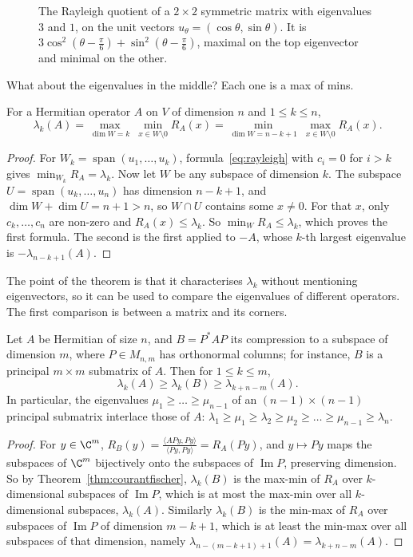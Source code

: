 \begin{figure}[ht]
\centering
{}
\caption{The Rayleigh quotient of a $2\times2$ symmetric matrix with eigenvalues $3$ and $1$, on the unit vectors
$u_\theta=(\cos\theta,\sin\theta)$. It is $3\cos^2(\theta-\frac\pi6)+\sin^2(\theta-\frac\pi6)$, maximal on the top eigenvector
and minimal on the other.}
\label{fig:rayleigh}
\end{figure}

What about the eigenvalues in the middle? Each one is a max of mins.

\begin{theorem}\label{thm:courantfischer}
For a Hermitian operator $A$ on $V$ of dimension $n$ and $1\le k\le n$,
\[
\lambda_k(A)=\max_{\dim W=k}\ \min_{x\in W\setminus0}R_A(x)=\min_{\dim W=n-k+1}\ \max_{x\in W\setminus0}R_A(x).
\]
\end{theorem}
\begin{proof}
For $W_k=\operatorname{span}(u_1,\dots,u_k)$, formula~\eqref{eq:rayleigh} with $c_i=0$ for $i>k$ gives $\min_{W_k}R_A=
\lambda_k$. Now let $W$ be any subspace of dimension $k$. The subspace $U=\operatorname{span}(u_k,\dots,u_n)$ has dimension
$n-k+1$, and $\dim W+\dim U=n+1>n$, so $W\cap U$ contains some $x\ne0$. For that $x$, only $c_k,\dots,c_n$ are non-zero
and $R_A(x)\le\lambda_k$. So $\min_WR_A\le\lambda_k$, which proves the first formula. The second is the first applied to
$-A$, whose $k$-th largest eigenvalue is $-\lambda_{n-k+1}(A)$.
\end{proof}

The point of the theorem is that it characterises $\lambda_k$ without mentioning eigenvectors, so it can be used to compare
the eigenvalues of different operators. The first comparison is between a matrix and its corners.

\begin{theorem}\label{thm:interlacing}
Let $A$ be Hermitian of size $n$, and $B=P^*AP$ its compression to a subspace of dimension $m$, where $P\in M_{n,m}$ has
orthonormal columns; for instance, $B$ is a principal $m\times m$ submatrix of $A$. Then for $1\le k\le m$,
\[
\lambda_k(A)\ge\lambda_k(B)\ge\lambda_{k+n-m}(A).
\]
In particular, the eigenvalues $\mu_1\ge\dots\ge\mu_{n-1}$ of an $(n-1)\times(n-1)$ principal submatrix interlace those of
$A$: $\lambda_1\ge\mu_1\ge\lambda_2\ge\mu_2\ge\dots\ge\mu_{n-1}\ge\lambda_n$.
\end{theorem}
\begin{proof}
For $y\in\C^m$, $R_B(y)=\frac{\langle APy,Py\rangle}{\langle Py,Py\rangle}=R_A(Py)$, and $y\mapsto Py$ maps the subspaces of
$\C^m$ bijectively onto the subspaces of $\operatorname{Im}P$, preserving dimension. So by Theorem~\ref{thm:courantfischer},
$\lambda_k(B)$ is the max-min of $R_A$ over $k$-dimensional subspaces of $\operatorname{Im}P$, which is at most the
max-min over all $k$-dimensional subspaces, $\lambda_k(A)$. Similarly $\lambda_k(B)$ is the min-max of $R_A$ over subspaces
of $\operatorname{Im}P$ of dimension $m-k+1$, which is at least the min-max over all subspaces of that dimension, namely
$\lambda_{n-(m-k+1)+1}(A)=\lambda_{k+n-m}(A)$.
\end{proof}

